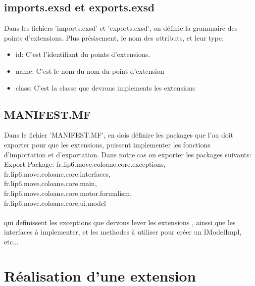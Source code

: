 \documentclass{article}
\begin{document}
\subsection{imports.exsd et exports.exsd}
Dans les fichiers 'imports.exsd' et 'exports.exsd', on définie la grammaire des 
points d'extensions. Plus présisement, le nom des attributs, et leur type.
\begin{itemize}
  \item id: C'est l'identifiant du points d'extensions.
  \item name: C'est le nom du nom du point d'extension
  \item class: C'est la classe que devrons implements les extensions
\end{itemize}

\subsection{MANIFEST.MF}
Dans le fichier 'MANIFEST.MF', en dois définire les packages que l'on doit exporter 
pour que les extensions, puissent implementer les fonctions d'importation et d'exportation.
Dans notre cas on exporter les packages suivants:
\\
Export-Package: fr.lip6.move.coloane.core.exceptions,\\
 fr.lip6.move.coloane.core.interfaces,\\
 fr.lip6.move.coloane.core.main,\\
 fr.lip6.move.coloane.core.motor.formalism,\\
 fr.lip6.move.coloane.core.ui.model\\
\\
qui definissent les exceptions que dervons lever les extensions , ainssi que les interfaces 
à implementer, et les methodes à utiliser pour créer un IModelImpl, etc...

\newpage

\section{Réalisation d'une extension}
\end{document}
